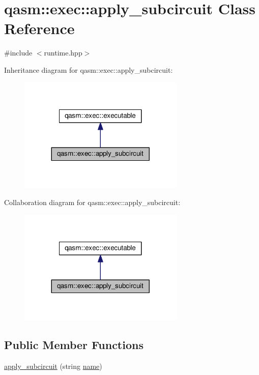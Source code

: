 \hypertarget{classqasm_1_1exec_1_1apply__subcircuit}{}\section{qasm\+:\+:exec\+:\+:apply\+\_\+subcircuit Class Reference}
\label{classqasm_1_1exec_1_1apply__subcircuit}


{\ttfamily \#include $<$runtime.\+hpp$>$}



Inheritance diagram for qasm\+:\+:exec\+:\+:apply\+\_\+subcircuit\+:\nopagebreak
\begin{figure}[H]
\begin{center}
\leavevmode
\includegraphics[width=224pt]{classqasm_1_1exec_1_1apply__subcircuit__inherit__graph}
\end{center}
\end{figure}


Collaboration diagram for qasm\+:\+:exec\+:\+:apply\+\_\+subcircuit\+:\nopagebreak
\begin{figure}[H]
\begin{center}
\leavevmode
\includegraphics[width=224pt]{classqasm_1_1exec_1_1apply__subcircuit__coll__graph}
\end{center}
\end{figure}
\subsection*{Public Member Functions}
\begin{DoxyCompactItemize}
\item 
\hyperlink{classqasm_1_1exec_1_1apply__subcircuit_ae8196f004b4d61d15a4ae6bad33ce8e5}{apply\+\_\+subcircuit} (string \hyperlink{classqasm_1_1exec_1_1apply__subcircuit_a6bf64c96ecf46285e9d18987a91b37fa}{name})
\end{DoxyCompactItemize}
